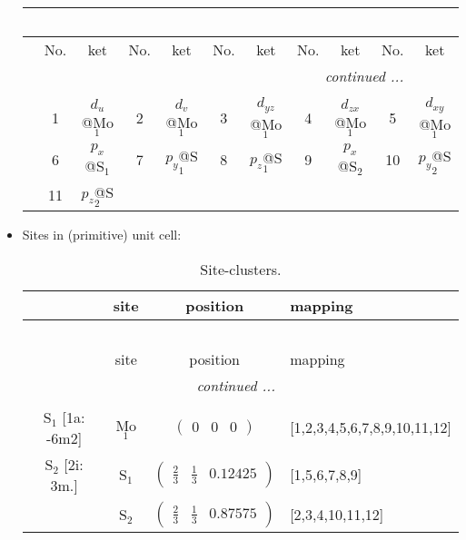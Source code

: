 \documentclass[fleqn,10pt,landscape]{article}
\begin{document}
\begin{itemize}
\begin{center}
\begin{longtable}{c|cc|cc|cc|cc|cc}
\multicolumn{10}{l}{\tablename\ \thetable{}} \\
 \hline \hline
 & No. & ket & No. & ket & No. & ket & No. & ket & No. & ket \\ \hline \endhead

 \hline \hline
\multicolumn{10}{r}{\footnotesize\it continued ...} \\ \endfoot

 \hline \hline
\multicolumn{10}{r}{} \\ \endlastfoot

 & 1 & $d_{u}$@Mo$_{1}$ & 2 & $d_{v}$@Mo$_{1}$ & 3 & $d_{yz}$@Mo$_{1}$ & 4 & $d_{zx}$@Mo$_{1}$ & 5 & $d_{xy}$@Mo$_{1}$ \\
& 6 & $p_{x}$@S$_{1}$ & 7 & $p_{y}$@S$_{1}$ & 8 & $p_{z}$@S$_{1}$ & 9 & $p_{x}$@S$_{2}$ & 10 & $p_{y}$@S$_{2}$ \\
& 11 & $p_{z}$@S$_{2}$ &  &  &  &  &  &  &  &  \\
\end{longtable}
\end{center}

\item Sites in (primitive) unit cell:
\begin{center}
\renewcommand{\arraystretch}{1.3}
\begin{longtable}{cc|c|l}
\caption{Site-clusters.}
 \\
 \hline \hline
 & site & position & mapping \\ \hline \endfirsthead

\multicolumn{3}{l}{\tablename\ \thetable{}} \\
 \hline \hline
 & site & position & mapping \\ \hline \endhead

 \hline \hline
\multicolumn{3}{r}{\footnotesize\it continued ...} \\ \endfoot

 \hline \hline
\multicolumn{3}{r}{} \\ \endlastfoot

S$_{1}$ [1a: -6m2] & Mo$_1$ & $\begin{pmatrix} 0 & 0 & 0 \end{pmatrix}$ & [1,2,3,4,5,6,7,8,9,10,11,12] \\ \hline
S$_{2}$ [2i: 3m.] & S$_1$ & $\begin{pmatrix} \frac{2}{3} & \frac{1}{3} & 0.12425 \end{pmatrix}$ & [1,5,6,7,8,9] \\
& S$_2$ & $\begin{pmatrix} \frac{2}{3} & \frac{1}{3} & 0.87575 \end{pmatrix}$ & [2,3,4,10,11,12] \\
\end{longtable}
\end{center}


\end{itemize}
\end{document}
